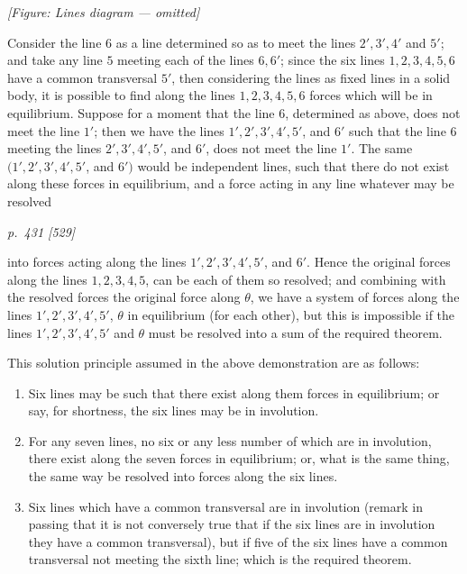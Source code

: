 \documentclass[11pt,a4paper]{article}
\theoremstyle{plain}
\theoremstyle{definition}
\begin{document}
\begin{center}
\textit{[Figure: Lines diagram --- omitted]}
\end{center}

Consider the line $6$ as a line determined so as to meet the lines $2', 3', 4'$ and $5'$;
and take any line $5$ meeting each of the lines $6, 6'$; since the six lines $1, 2, 3, 4, 5, 6$
have a common transversal $5'$, then considering the lines as fixed lines in a solid
body, it is possible to find along the lines $1, 2, 3, 4, 5, 6$ forces which will be in
equilibrium. Suppose for a moment that the line $6$, determined as above, does not
meet the line $1'$; then we have the lines $1', 2', 3', 4', 5'$, and $6'$ such that the
line $6$ meeting the lines $2', 3', 4', 5'$, and $6'$, does not meet the line $1'$. The same
$(1', 2', 3', 4', 5'$, and $6')$ would be independent lines, such that there do not exist along
these forces in equilibrium, and a force acting in any line whatever may be resolved

\clearpage

\bigskip
\textit{p.~431 [529]}
\smallskip

into forces acting along the lines $1', 2', 3', 4', 5'$, and $6'$. Hence the original forces
along the lines $1, 2, 3, 4, 5$, can be each of them so resolved; and combining with
the resolved forces the original force along $\theta$, we have a system of forces along the
lines $1', 2', 3', 4', 5'$, $\theta$ in equilibrium (for each other), but this is impossible if the lines
$1', 2', 3', 4', 5'$ and $\theta$ must be resolved into a sum of the required theorem.

This solution principle assumed in the above demonstration are as follows:
\begin{enumerate}[label=(\arabic*)]
\item Six lines may be such that there exist along them forces in equilibrium;
or say, for shortness, the six lines may be in involution.
\item For any seven lines, no six or any less number of which are in involution, there exist along the seven forces in equilibrium; or, what is the same thing, the same way be resolved into forces along the six lines.
\item Six lines which have a common transversal are in involution (remark in passing that it is not conversely true that if the six lines are in involution they have a common transversal), but if five of the six lines have a common transversal not meeting the sixth line; which is the required theorem.
\end{enumerate}
\end{document}
